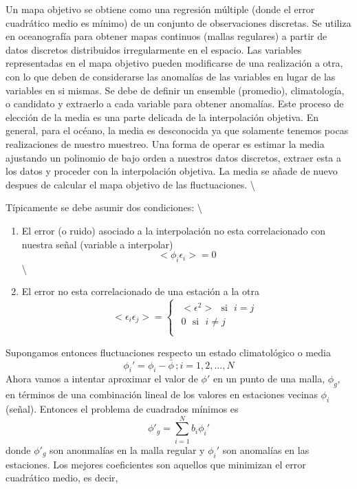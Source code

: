 \documentclass[
]{agujournal2019}
\providecommand{\tightlist}{%
  \setlength{\itemsep}{0pt}\setlength{\parskip}{0pt}}\usepackage{longtable,booktabs,array}
\begin{document}
Un mapa objetivo se obtiene como una regresión múltiple (donde el error
cuadrático medio es mínimo) de un conjunto de observaciones discretas.
Se utiliza en oceanografía para obtener mapas continuos (mallas
regulares) a partir de datos discretos distribuidos irregularmente en el
espacio. Las variables representadas en el mapa objetivo pueden
modificarse de una realización a otra, con lo que deben de considerarse
las anomalías de las variables en lugar de las variables en si mismas.
Se debe de definir un ensemble (promedio), climatología, o candidato y
extraerlo a cada variable para obtener anomalías. Este proceso de
elección de la media es una parte delicada de la interpolación objetiva.
En general, para el océano, la media es desconocida ya que solamente
tenemos pocas realizaciones de nuestro muestreo. Una forma de operar es
estimar la media ajustando un polinomio de bajo orden a nuestros datos
discretos, extraer esta a los datos y proceder con la interpolación
objetiva. La media se añade de nuevo despues de calcular el mapa
objetivo de las fluctuaciones. \textbackslash{}

Típicamente se debe asumir dos condiciones: \textbackslash{}

\begin{enumerate}
\def\labelenumi{(\arabic{enumi})}
\tightlist
\item
  El error (o ruido) asociado a la interpolación no esta correlacionado
  con nuestra señal (variable a interpolar) \[<\phi_i\epsilon_i>=0\]
  \textbackslash{}
\item
  El error no esta correlacionado de una estación a la otra
  \[<\epsilon_i \epsilon_j>=
  \begin{cases}
  \begin{array}{c}
     <\epsilon^2> \,\,\,\,\text{si} \,\,\,\,i=j\\
     0    \,\,\,\,        \text{si} \,\,\,\,i\ne j\\
  \end{array}
  \end{cases}\]
\end{enumerate}

Supongamos entonces fluctuaciones respecto un estado climatológico o
media \[\phi_i'=\phi_i-\bar{\phi}\,; i=1,2,...,N\] Ahora vamos a
intentar aproximar el valor de \(\phi'\) en un punto de una malla,
\(\phi_g\), en términos de una combinación lineal de los valores en
estaciones vecinas \(\phi_i\) (señal). Entonces el problema de cuadrados
mínimos es \[\phi'_g=\sum\limits^N_{i=1}b_i\phi_i'\] donde \(\phi'_g\)
son anonmalías en la malla regular y \(\phi_i'\) son anomalías en las
estaciones. Los mejores coeficientes son aquellos que minimizan el error
cuadrático medio, es decir,
\end{document}
